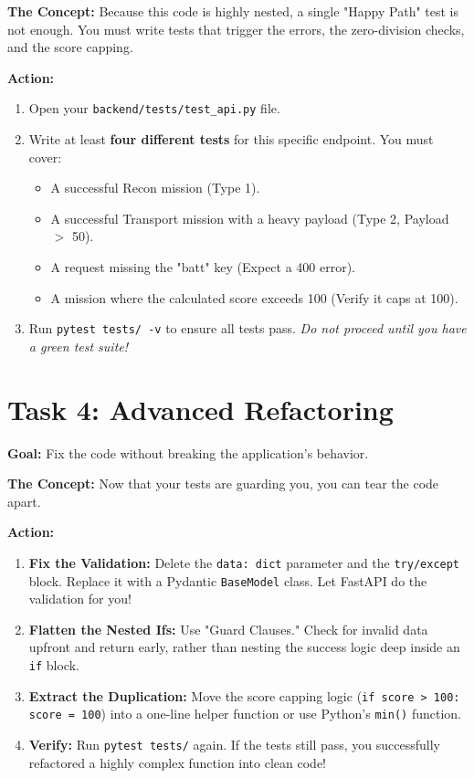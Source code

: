 \documentclass[a4paper,12pt]{article}
\begin{document}
\textbf{The Concept:} Because this code is highly nested, a single "Happy Path" test is not enough. You must write tests that trigger the errors, the zero-division checks, and the score capping.

\vspace{0.3cm}
\textbf{Action:}
\begin{enumerate}
    \item Open your \texttt{backend/tests/test\_api.py} file. 
    \item Write at least \textbf{four different tests} for this specific endpoint. You must cover:
    \begin{itemize}
        \item A successful Recon mission (Type 1).
        \item A successful Transport mission with a heavy payload (Type 2, Payload $>$ 50).
        \item A request missing the "batt" key (Expect a 400 error).
        \item A mission where the calculated score exceeds 100 (Verify it caps at 100).
    \end{itemize}
    \item Run \texttt{pytest tests/ -v} to ensure all tests pass. \textit{Do not proceed until you have a green test suite!}
\end{enumerate}


\section*{Task 4: Advanced Refactoring}

\textbf{Goal:} Fix the code without breaking the application's behavior.

\textbf{The Concept:} Now that your tests are guarding you, you can tear the code apart.

\vspace{0.3cm}
\textbf{Action:}
\begin{enumerate}
    \item \textbf{Fix the Validation:} Delete the \texttt{data: dict} parameter and the \texttt{try/except} block. Replace it with a Pydantic \texttt{BaseModel} class. Let FastAPI do the validation for you!
    \item \textbf{Flatten the Nested Ifs:} Use "Guard Clauses." Check for invalid data upfront and return early, rather than nesting the success logic deep inside an \texttt{if} block.
    \item \textbf{Extract the Duplication:} Move the score capping logic (\texttt{if score > 100: score = 100}) into a one-line helper function or use Python's \texttt{min()} function.
    \item \textbf{Verify:} Run \texttt{pytest tests/} again. If the tests still pass, you successfully refactored a highly complex function into clean code!
\end{enumerate}
\end{document}
